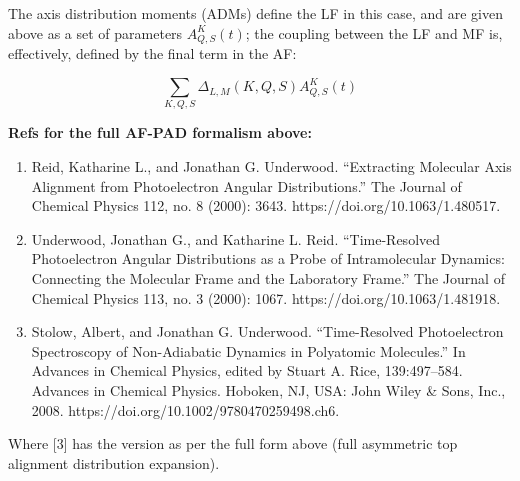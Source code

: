 The axis distribution moments (ADMs) define the LF in this case, and are
given above as a set of parameters \(A_{Q,S}^{K}(t)\); the coupling
between the LF and MF is, effectively, defined by the final term in the
AF:

\begin{equation}
\sum_{K,Q,S}\Delta_{L,M}(K,Q,S)A_{Q,S}^{K}(t)
\end{equation}

\textbf{Refs for the full AF-PAD formalism above:}

\begin{enumerate}
\def\labelenumi{\arabic{enumi}.}
\tightlist
\item
  Reid, Katharine L., and Jonathan G. Underwood. ``Extracting Molecular
  Axis Alignment from Photoelectron Angular Distributions.'' The Journal
  of Chemical Physics 112, no. 8 (2000): 3643.
  https://doi.org/10.1063/1.480517.
\item
  Underwood, Jonathan G., and Katharine L. Reid. ``Time-Resolved
  Photoelectron Angular Distributions as a Probe of Intramolecular
  Dynamics: Connecting the Molecular Frame and the Laboratory Frame.''
  The Journal of Chemical Physics 113, no. 3 (2000): 1067.
  https://doi.org/10.1063/1.481918.
\item
  Stolow, Albert, and Jonathan G. Underwood. ``Time-Resolved
  Photoelectron Spectroscopy of Non-Adiabatic Dynamics in Polyatomic
  Molecules.'' In Advances in Chemical Physics, edited by Stuart A.
  Rice, 139:497--584. Advances in Chemical Physics. Hoboken, NJ, USA:
  John Wiley \& Sons, Inc., 2008.
  https://doi.org/10.1002/9780470259498.ch6.
\end{enumerate}

Where {[}3{]} has the version as per the full form above (full
asymmetric top alignment distribution expansion).
